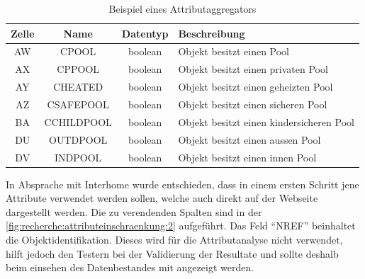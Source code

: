 \begin{table}[H] 
	\caption{Beispiel eines Attributaggregators}
	\centering
		\label{fig:recherche:attributeinschraenkung:1}
	\begin{tabular}{ | c | c | c | l | } 
		\hline 
		\rowcolor{tableheadcolor}
		\bfseries Zelle & \bfseries Name & \bfseries Datentyp & \bfseries Beschreibung \\ \hline 
		AW & CPOOL & boolean & Objekt besitzt einen Pool \\ \hline 
		AX & CPPOOL & boolean & Objekt besitzt einen privaten Pool \\ \hline 
		AY & CHEATED & boolean & Objekt besitzt einen geheizten Pool \\ \hline 
		AZ & CSAFEPOOL & boolean & Objekt besitzt einen sicheren Pool \\ \hline 
		BA & CCHILDPOOL & boolean & Objekt besitzt einen kindersicheren Pool \\ \hline 
		DU & OUTDPOOL & boolean & Objekt besitzt einen aussen Pool \\ \hline 
		DV & INDPOOL & boolean & Objekt besitzt einen innen Pool \\ \hline 
	\end{tabular}
\end{table}

In Absprache mit Interhome wurde entschieden, dass in einem ersten Schritt jene Attribute verwendet werden sollen, welche auch direkt auf der Webseite dargestellt werden. Die zu verendenden Spalten sind in der \cref{fig:recherche:attributeinschraenkung:2} aufgeführt. Das Feld "`NREF"' beinhaltet die Objektidentifikation. Dieses wird für die Attributanalyse nicht verwendet, hilft jedoch den Testern bei der Validierung der Resultate und sollte deshalb beim einsehen des Datenbestandes mit angezeigt werden.

